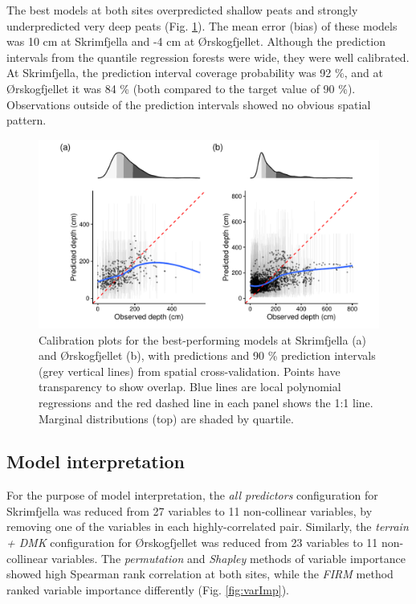 \documentclass[soil, manuscript]{copernicus}
\begin{document}
The best models at both sites overpredicted shallow peats and strongly underpredicted very deep peats (Fig. \ref{fig:calPlots}).
The mean error (bias) of these models was 10 cm at Skrimfjella and -4 cm at Ørskogfjellet.
Although the prediction intervals from the quantile regression forests were wide, they were well calibrated.
At Skrimfjella, the prediction interval coverage probability was 92 \%, and at Ørskogfjellet it was 84 \% (both compared to the target value of 90 \%).
Observations outside of the prediction intervals showed no obvious spatial pattern.

\begin{figure}
\includegraphics[width=1\linewidth]{figures/calibration_plots} \caption{Calibration plots for the best-performing models at Skrimfjella (a) and Ørskogfjellet (b), with predictions and 90 \% prediction intervals (grey vertical lines) from spatial cross-validation. Points have transparency to show overlap. Blue lines are local polynomial regressions and the red dashed line in each panel shows the 1:1 line. Marginal distributions (top) are shaded by quartile.}\label{fig:calPlots}
\end{figure}

\subsection{Model interpretation}

For the purpose of model interpretation, the \emph{all predictors} configuration for Skrimfjella was reduced from 27 variables to 11 non-collinear variables, by removing one of the variables in each highly-correlated pair.
Similarly, the \emph{terrain + DMK} configuration for Ørskogfjellet was reduced from 23 variables to 11 non-collinear variables.
The \emph{permutation} and \emph{Shapley} methods of variable importance showed high Spearman rank correlation at both sites, while the \emph{FIRM} method ranked variable importance differently (Fig. \ref{fig:varImp}).
\end{document}
